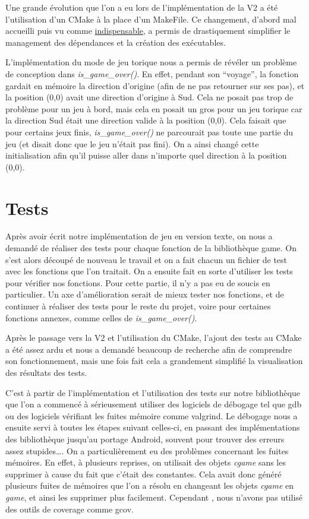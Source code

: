 ﻿\documentclass[12pt]{article}
\begin{document}
Une grande évolution que l’on a eu lors de l’implémentation de la V2 a été l’utilisation d’un CMake à la place d’un MakeFile. Ce changement, d’abord mal accueilli puis vu comme \underline{indispensable}, a permis de drastiquement simplifier le management des dépendances et la création des exécutables.


L’implémentation du mode de jeu torique nous a permis de révéler un problème de conception dans \emph{is\_game\_over()}. En effet, pendant son “voyage”, la fonction gardait en mémoire la direction d’origine (afin de ne pas retourner sur ses pas), et la position (0,0) avait une direction d’origine à Sud. Cela ne posait pas trop de problème pour un jeu à bord, mais cela en posait un gros pour un jeu torique car la direction Sud était une direction valide à la position (0,0). Cela faisait que pour certains jeux finis, \emph{is\_game\_over()} ne parcourait pas toute une partie du jeu (et disait donc que le jeu n’était pas fini). On a ainsi changé cette initialisation afin qu’il puisse aller dans n’importe quel direction à la position (0,0).


\section{Tests}


Après avoir écrit notre implémentation de jeu en version texte, on nous a demandé de réaliser des tests pour chaque fonction de la bibliothèque game.
On s'est alors découpé de nouveau le travail et on a fait chacun un fichier de test avec les fonctions que l'on traitait.
On a ensuite fait en sorte d’utiliser les tests pour vérifier nos fonctions.
Pour cette partie, il n’y a pas eu de soucis en particulier.
Un axe d’amélioration serait de mieux tester nos fonctions, et de continuer à réaliser des tests pour le reste du projet, voire pour certaines fonctions annexes, comme celles de \emph{is\_game\_over()}.


Après le passage vers la V2 et l’utilisation du CMake, l’ajout des tests au CMake a été assez ardu et nous a demandé beaucoup de recherche afin de comprendre son fonctionnement, mais une fois fait cela a grandement simplifié la visualisation des résultats des tests.


C'est à partir de l'implémentation et l'utilisation des tests sur notre bibliothèque que l'on a commencé à sérieusement utiliser des logiciels de débogage tel que gdb ou des logiciels vérifiant les fuites mémoire comme valgrind.
Le débogage nous a ensuite servi à toutes les étapes suivant celles-ci, en passant des implémentations des bibliothèque jusqu’au portage Android, souvent pour trouver des erreurs assez stupides….
On a particulièrement eu des problèmes concernant les fuites mémoires. En effet, à plusieurs reprises, on utilisait des objets \emph{cgame} sans les supprimer à cause du fait que c’était des constantes. Cela avait donc généré plusieurs fuites de mémoires que l’on a résolu en changeant les objets \emph{cgame} en \emph{game}, et ainsi les supprimer plus facilement.
Cependant , nous n’avons pas utilisé des outils de coverage comme gcov.
\end{document}
